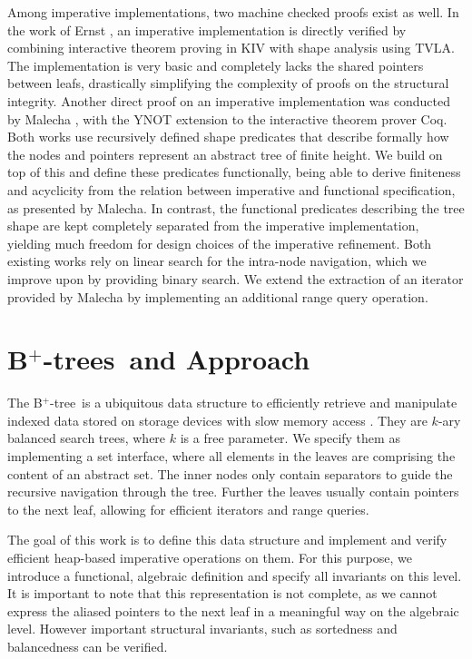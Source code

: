 \documentclass[a4paper,UKenglish,cleveref, autoref, thm-restate]{lipics-v2021}
\newcommand{\btree}{B$^+$-tree}
\newcommand{\btrees}{B$^+$-trees}
\begin{document}
Among imperative implementations, two machine checked proofs exist as well.
In the work of Ernst \cite{DBLP:journals/sosym/ErnstSR15},
an imperative implementation is directly verified
by combining interactive theorem proving in KIV
with shape analysis using TVLA.
The implementation is very basic and completely lacks
the shared pointers between leafs, drastically
simplifying the complexity of proofs on the structural integrity.
Another direct proof on an imperative implementation
was conducted by Malecha \cite{DBLP:conf/popl/MalechaMSW10}, with the YNOT
extension to the interactive theorem prover Coq.
Both works use recursively defined shape predicates
that describe formally how the nodes and pointers
represent an abstract tree of finite height.
We build on top of this and define these predicates functionally,
being able to derive finiteness and acyclicity from the relation between imperative and functional specification,
as presented by Malecha.
In contrast, the functional predicates describing the tree shape are kept
completely separated from the imperative implementation,
yielding much freedom for design choices of the imperative refinement.
Both existing works rely on linear search for the intra-node navigation,
which we improve upon by providing binary search.
We extend the extraction of an iterator provided by Malecha
by implementing an additional range query operation. 


\section{\btrees\ and Approach}
\label{sec:approach}

The \btree\ is a ubiquitous data structure to efficiently retrieve and manipulate
indexed data stored on storage devices with slow memory access \cite{DBLP:journals/csur/Comer79}.
They are $k$-ary balanced search trees, where $k$ is a free parameter.
We specify them as implementing a set interface,
where all elements in the leaves are comprising the content of an abstract set.
The inner nodes only contain separators to guide the recursive navigation through the tree.
Further the leaves usually contain pointers
to the next leaf, allowing for efficient iterators and range queries.

The goal of this work is to define this data structure
and implement and verify efficient heap-based imperative operations on them.
For this purpose, we introduce a functional, algebraic definition and
specify all invariants on this level.
It is important to note that this representation is not complete,
as we cannot express the aliased pointers to the next leaf in a meaningful
way on the algebraic level.
However important structural invariants, such as sortedness and balancedness
can be verified.
\end{document}
